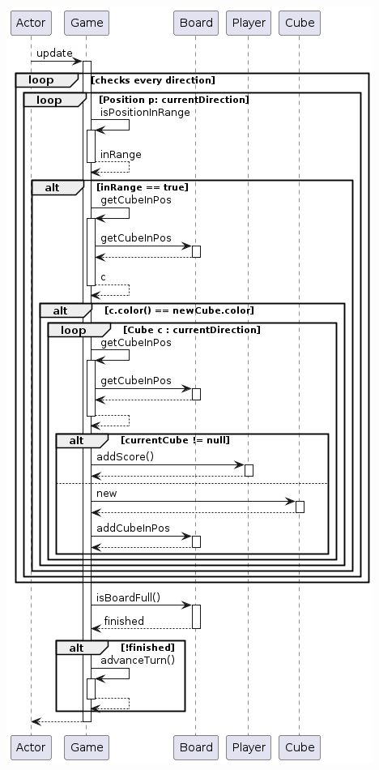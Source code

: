 \documentclass[../DocumentoOficial.tex]{subfiles}
\begin{document}
\begin{sprint}[1]
\begin{center}
\includegraphics[scale=0.65]{updateGameS1.png}
\end{center}

\end{sprint}
\newpage
\end{document}
